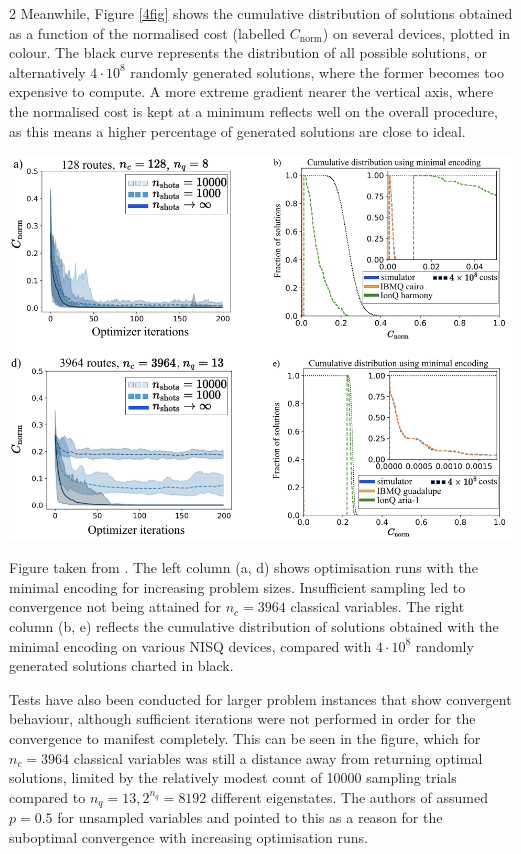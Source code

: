 \documentclass [10pt]{article}
\begin{document}
\begin {multicols}{2}
Meanwhile, Figure \ref{4fig} shows the cumulative distribution of solutions
obtained as a function of the normalised cost (labelled $C_{\text{norm}}$) on
several devices, plotted in colour. The black curve represents the distribution
of all possible solutions, or alternatively $4 \cdot 10^8$ randomly generated
solutions, where the former becomes too expensive to compute. A more extreme
gradient nearer the vertical axis, where the normalised cost is kept at a
minimum reflects well on the overall procedure, as this means a higher
percentage of generated solutions are close to ideal.

\begin {figure*}[!ht]
\includegraphics {4fig}
\caption	{
	Figure taken from \cite{effvrp}. The left column (a, d) shows optimisation
	runs with the minimal encoding for increasing problem sizes. Insufficient
	sampling led to convergence not being attained for $n_c = 3964$ classical
	variables. The right column (b, e) reflects the cumulative distribution of
	solutions obtained with the minimal encoding on various NISQ devices,
	compared with $4 \cdot 10^8$ randomly generated solutions charted in black.
}
\label {4fig}
\end {figure*}

Tests have also been conducted for larger problem instances that show
convergent behaviour, although sufficient iterations were not performed in
order for the convergence to manifest completely. This can be seen in the
figure, which for $n_c = 3964$ classical variables was still a distance away
from returning optimal solutions, limited by the relatively modest count of
10000 sampling trials compared to $n_q = 13, 2^{n_q} = 8192$ different
eigenstates. The authors of \cite{effvrp} assumed $p = 0.5$ for unsampled
variables and pointed to this as a reason for the suboptimal convergence
with increasing optimisation runs.


\end{multicols}
\end{document}

